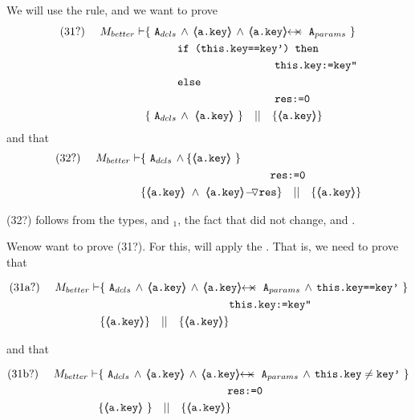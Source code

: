 \begin{proofO}

We will use the  {} rule, and we want to prove
\\
\begin{align*}
\text{(31?)}  \ \ \ \ M_{better} \vdash 
		&	\{  \ \Alocals\,\wedge\, {\inside{\prg{a.key}}} \, \wedge \, \protectedFrom {\prg{a.key}} {\Aparams} \  \} \\
		& \SPT   \prg{if (this.key==key') then }\\
		& \SPT \SPT   \SPT\SPT  \prg{this.key:=key''} \\
	        & \SPT   \prg{else }\\
		& \SPT\SPT   \SPT\SPT  \prg{res:=0} \\
		& \{ \ \Alocals\,\wedge\ {\inside{\prg{a.key}}}\    \} \ \ \  || \ \ \ 
		   \{ {\inside{\prg{a.key}}} \}
\end{align*}
and that
\begin{align*}
\text{(32?)}  \ \ \ \ M_{better} \vdash
          &  \{ \ \Alocals\,\wedge\{\inside{\prg{a.key}}\  \}  \\
		& \SPT\SPT   \SPT\SPT  \prg{res:=0} \\
		& \{ {\inside{\prg{a.key}}}\ \wedge\ {\PushASLong {\prg{res}} {\inside{\prg{a.key}}}}  \} \ \ \  || \ \ \ 
		   \{ {\inside{\prg{a.key}}} \}
\end{align*}

(32?) follows   from the types, and {}$_1$, the fact that  did not change, and  .

\vspace{.5cm}
Wenow  want to  prove (31?). For this, will apply the {}. That is, we need to prove that

\begin{align*}
\text{(31a?)}  \ \ \ \ M_{better} \vdash 
		&	\{  \ \Alocals\,\wedge\, {\inside{\prg{a.key}}} \, \wedge \, \protectedFrom {\prg{a.key}} {\Aparams} \, \wedge  \,  \prg{this.key==key'}\  \} \\
		& \SPT \SPT   \SPT\SPT  \prg{this.key:=key''} \\
		& \{ {\inside{\prg{a.key}}}  \} \ \ \  || \ \ \ 
		   \{ {\inside{\prg{a.key}}} \}
\end{align*}
 
and that
 
\begin{align*}
\text{(31b?)}  \ \ \ \ M_{better} \vdash 
		&	\{  \ \Alocals\,\wedge\, {\inside{\prg{a.key}}} \, \wedge \, \protectedFrom {\prg{a.key}} {\Aparams} \, \wedge  \,  \prg{this.key}\neq\prg{key'}\  \} \\
		& \SPT\SPT   \SPT\SPT  \prg{res:=0} \\
		& \{ {\inside{\prg{a.key}}}\   \} \ \ \  || \ \ \ 
		   \{ {\inside{\prg{a.key}}} \}
\end{align*}


\end{proofO}
